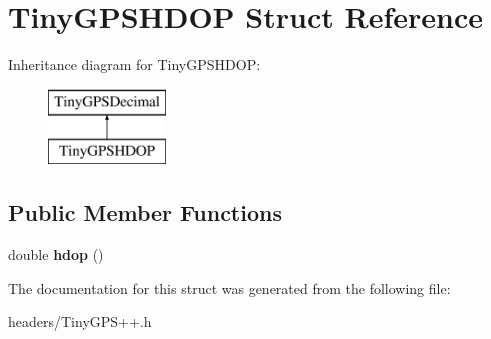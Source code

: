 \hypertarget{struct_tiny_g_p_s_h_d_o_p}{}\section{Tiny\+G\+P\+S\+H\+D\+OP Struct Reference}
\label{struct_tiny_g_p_s_h_d_o_p}
Inheritance diagram for Tiny\+G\+P\+S\+H\+D\+OP\+:\begin{figure}[H]
\begin{center}
\leavevmode
\includegraphics[height=2.000000cm]{struct_tiny_g_p_s_h_d_o_p}
\end{center}
\end{figure}
\subsection*{Public Member Functions}
\begin{DoxyCompactItemize}
\item 
double {\bfseries hdop} ()\hypertarget{struct_tiny_g_p_s_h_d_o_p_a27cd35588c96eefb690bba46497d20d7}{}\label{struct_tiny_g_p_s_h_d_o_p_a27cd35588c96eefb690bba46497d20d7}

\end{DoxyCompactItemize}


The documentation for this struct was generated from the following file\+:\begin{DoxyCompactItemize}
\item 
headers/Tiny\+G\+P\+S++.\+h\end{DoxyCompactItemize}
